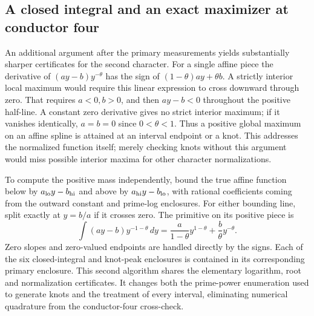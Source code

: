 \documentclass[12pt,letterpaper]{article}
\begin{document}
\subsection{A closed integral and an exact maximizer at conductor four}
An additional argument after the primary measurements yields substantially sharper certificates for the second character. For a single affine piece the derivative of \((ay-b)y^{-\theta}\) has the sign of \((1-\theta)ay+\theta b\). A strictly interior local maximum would require this linear expression to cross downward through zero. That requires \(a<0,b>0\), and then \(ay-b<0\) throughout the positive half-line. A constant zero derivative gives no strict interior maximum; if it vanishes identically, \(a=b=0\) since \(0<\theta<1\). Thus a positive global maximum on an affine spline is attained at an interval endpoint or a knot. This addresses the normalized function itself; merely checking knots without this argument would miss possible interior maxima for other character normalizations.

To compute the positive mass independently, bound the true affine function below by \(a_{\rm lo}y-b_{\rm hi}\) and above by \(a_{\rm hi}y-b_{\rm lo}\), with rational coefficients coming from the outward constant and prime-log enclosures. For either bounding line, split exactly at \(y=b/a\) if it crosses zero. The primitive on its positive piece is
\[
     \int(ay-b)y^{-1-\theta}\,dy
       = \frac{a}{1-\theta}y^{1-\theta}
           +\frac{b}{\theta}y^{-\theta} .
\]
Zero slopes and zero-valued endpoints are handled directly by the signs. Each of the six closed-integral and knot-peak enclosures is contained in its corresponding primary enclosure. This second algorithm shares the elementary logarithm, root and normalization certificates. It changes both the prime-power enumeration used to generate knots and the treatment of every interval, eliminating numerical quadrature from the conductor-four cross-check.
\end{document}
